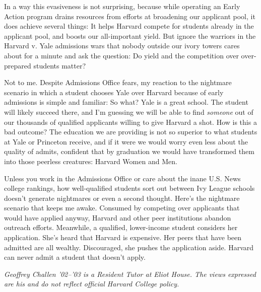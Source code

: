 In a way this evasiveness is not surprising, because while operating an Early
Action program drains resources from efforts at broadening our applicant
pool, it does achieve several things: It helps Harvard compete for students
already in the applicant pool, and boosts our all-important yield. But ignore
the warriors in the Harvard v. Yale admissions wars that nobody outside our
ivory towers cares about for a minute and ask the question: Do yield and the
competition over over-prepared students matter?

Not to me. Despite Admissions Office fears, my reaction to the nightmare
scenario in which a student chooses Yale over Harvard because of early
admissions is simple and familiar: So what? Yale is a great school. The
student will likely succeed there, and I'm guessing we will be able to find
\textit{someone} out of our thousands of qualified applicants willing to give
Harvard a shot. How is this a bad outcome? The education we are providing is
not so superior to what students at Yale or Princeton receive, and if it were
we would worry even less about the quality of admits, confident that by
graduation we would have transformed them into those peerless creatures:
Harvard Women and Men.

Unless you work in the Admissions Office or care about the inane U.S. News
college rankings, how well-qualified students sort out between Ivy League
schools doesn't generate nightmares or even a second thought. Here's the
nightmare scenario that keeps me awake. Consumed by competing over applicants
that would have applied anyway, Harvard and other peer institutions abandon
outreach efforts. Meanwhile, a qualified, lower-income student considers her
application. She's heard that Harvard is expensive. Her peers that have been
admitted are all wealthy. Discouraged, she pushes the application aside.
Harvard can never admit a student that doesn't apply.


\textit{Geoffrey Challen '02--'03 is a Resident Tutor at Eliot House. The
views expressed are his and do not reflect official Harvard College policy.}
